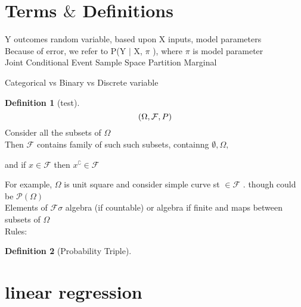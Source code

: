 \documentclass{article}
\theoremstyle{definition}
\newtheorem{definition}{Definition}[section]
\theoremstyle{remark}
\begin{document}
\section{Terms $\&$ Definitions}
Y outcomes random variable, based upon X inputs, model parameters \\
Because of error,  we refer to P(Y $\mid$ X,  $\pi$ ), where $\pi$ is model parameter\\

Joint
Conditional
Event
Sample Space
Partition
Marginal

Categorical vs Binary vs Discrete variable

\begin{definition}[test]  
$$
(\Omega, \mathcal{F}, P ) \\
$$
Consider all the subsets of $\Omega$\\

Then $\mathcal{F}$ contains family of such such subsets, containng  $\emptyset, \Omega,$ 

and if $x \in \mathcal{F}$ then $x^\complement \in \mathcal{F}$

For example, $\Omega$ is  unit square and consider simple curve st $\in \mathcal{F}$ .  
though  could be $\mathcal{P}(\Omega)$ \\

Elements of $\mathcal{F} \sigma$ algebra (if countable) or algebra if finite and
maps between subsets of $\Omega$ \\
Rules:  
\end{definition}

\begin{definition}[Probability Triple]  
$$
$$
$$
$$ 
\end{definition}




\section{linear regression}
\end{document}
